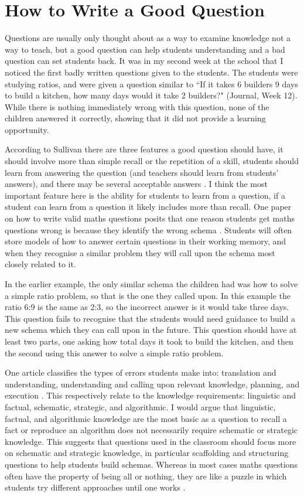 \documentclass[11pt, a4paper, notitlepage]{article}
\begin{document}
\section*{How to Write a Good Question}
Questions are usually only thought about as a way to examine knowledge not a way to teach, but a good question can help students understanding and a bad question can set students back. It was in my second week at the school that I noticed the first badly written questions given to the students. The students were studying ratios, and were given a question similar to ``If it takes 6 builders 9 days to build a kitchen, how many days would it take 2 builders?" (Journal, Week 12). While there is nothing immediately wrong with this question, none of the children answered it correctly, showing that it did not provide a learning opportunity.
\par
According to Sullivan there are three features a good question should have, it should involve more than simple recall or the repetition of a skill, students should learn from answering the question (and teachers should learn from students' answers), and there may be several acceptable answers \cite{Sullivan:1997}. I think the most important feature here is the ability for students to learn from a question, if a student can learn from a question it likely includes more than recall. One paper on how to write valid maths questions posits that one reason students get maths questions wrong is because they identify the wrong schema \cite{Pollitt:2002}. Students will often store models of how to answer certain questions in their working memory, and when they recognise a similar problem they will call upon the schema most closely related to it. 
\par
In the earlier example, the only similar schema the children had was how to solve a simple ratio problem, so that is the one they called upon. In this example the ratio 6:9 is the same as 2:3, so the incorrect answer is it would take three days. This question fails to recognise that the students would need guidance to build a new schema which they can call upon in the future. This question should have at least two parts, one asking how total days it took to build the kitchen, and then the second using this answer to solve a simple ratio problem.
\par
One article classifies the types of errors students make into: translation and understanding, understanding and calling upon relevant knowledge, planning, and execution \cite{Fisher:1996}. This respectively relate to the knowledge requirements: linguistic and factual, schematic, strategic, and algorithmic. I would argue that linguistic, factual, and algorithmic knowledge are the most basic as a question to recall a fact or reproduce an algorithm does not necessarily require schematic or strategic knowledge. This suggests that questions used in the classroom should focus more on schematic and strategic knowledge, in particular scaffolding and structuring questions to help students build schemas. Whereas in most cases maths questions often have the property of being all or nothing, they are like a puzzle in which students try different approaches until one works \cite{Pollitt:2002}. 
\end{document}
